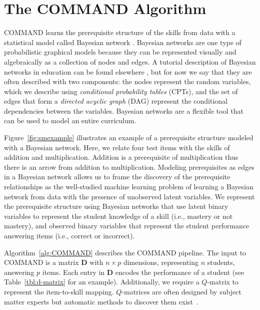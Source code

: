 \documentclass{edm_template}
\begin{document}
\newpage
\section{The COMMAND Algorithm}
\label{sec:pre_pipeline}
COMMAND learns the prerequisite structure of the skills from data with a statistical model called Bayesian network \cite{pearl1988probabilistic,spirtes2001causation}.
Bayesian networks are one type of probabilistic graphical models because they can be represented visually and algebraically as a collection of nodes and edges.
A tutorial description of Bayesian networks in education can be found elsewhere \cite{mislevy1999bayes}, 
but for now we say that they are often described with two components: 
the  nodes represent the random variables, which we describe using \textit{conditional probability tables} (CPTs),
and the set of edges that form a \textit{directed acyclic graph} (DAG) represent the conditional dependencies between the variables.
Bayesian networks are a flexible tool that can be used to model an entire curriculum.

Figure~\ref{fig:smexample} illustrates an example of a prerequisite structure modeled with a Bayesian network.
Here, we relate four test items with the skills of addition and multiplication.
Addition is a prerequisite of multiplication thus there is an arrow from addition to multiplication.
Modeling prerequisites as edges in a Bayesian network allows us to frame the discovery of the prerequisite relationships as the well-studied machine learning problem of
learning a Bayesian network from data with the presence of unobserved latent variables.
We represent the prerequisite structure using Bayesian networks that use latent binary variables to represent the student knowledge of a skill (i.e., mastery or not mastery), 
and observed binary variables that represent the student performance answering items (i.e., correct or incorrect).



Algorithm~\ref{alg:COMMAND} describes the COMMAND pipeline.
The input to COMMAND is a  matrix $\mathbf{D}$ with $n \times p$ dimensions,
representing $n$ students, answering $p$ items.
Each entry in $\mathbf{D}$ encodes the performance of a student (see Table~\ref{tbl:d-matrix} for an example).
Additionally, we require a $Q$-matrix to represent the item-to-skill mapping.
$Q$-matrices are often designed by subject matter experts but automatic methods to discover them exist~\cite{jp_aistats_2015}.
\end{document}
